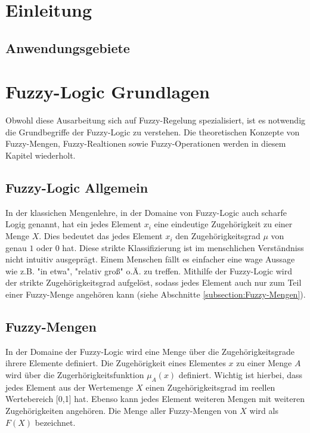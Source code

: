 \documentclass[12pt,a4paper,bibliography=totocnumbered,listof=totocnumbered]{scrartcl}
\begin{document}
\section{Einleitung}

\subsection{Anwendungsgebiete}

\section{Fuzzy-Logic Grundlagen}

Obwohl diese Ausarbeitung sich auf Fuzzy-Regelung spezialisiert, ist es notwendig die Grundbegriffe der Fuzzy-Logic zu verstehen. Die theoretischen Konzepte von Fuzzy-Mengen, Fuzzy-Realtionen sowie Fuzzy-Operationen werden in diesem Kapitel wiederholt.

\subsection{Fuzzy-Logic Allgemein}

In der klassichen Mengenlehre, in der Domaine von Fuzzy-Logic auch scharfe Logig genannt, hat ein jedes Element $x_i$ eine eindeutige Zugehörigkeit zu einer Menge $X$. Dies bedeutet das jedes Element $x_i$ den Zugehörigkeitsgrad $\mu$ von genau $1$ oder $0$ hat. Diese strikte Klassifizierung ist im menschlichen Verständniss nicht intuitiv ausgeprägt. Einem Menschen fällt es einfacher eine wage Aussage wie z.B. "in etwa", "relativ groß" o.Ä. zu treffen. Mithilfe der Fuzzy-Logic wird der strikte Zugehörigkeitsgrad aufgelöst, sodass jedes Element auch nur zum Teil einer Fuzzy-Menge angehören kann (siehe Abschnitte \ref{subsection:Fuzzy-Mengen}).

\label{subsection:Fuzzy-Mengen}
\subsection{Fuzzy-Mengen}

In der Domaine der Fuzzy-Logic wird eine Menge über die Zugehörigkeitsgrade ihrere Elemente definiert. Die Zugehörigkeit eines Elementes $x$ zu einer Menge $A$ wird über die Zugerhörigkeitsfunktion $\mu_A(x)$ definiert. Wichtig ist hierbei, dass jedes Element aus der Wertemenge $X$ einen Zugehörigkeitsgrad im reellen Wertebereich [0,1] hat. Ebenso kann jedes Element weiteren Mengen mit weiteren Zugehörigkeiten angehören. Die Menge aller Fuzzy-Mengen von $X$ wird als $F(X)$ bezeichnet.
\end{document}
